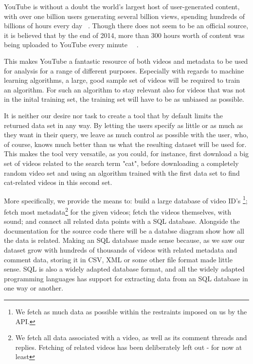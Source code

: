 
YouTube is without a doubt the world's largest host of user-generated content,
with over one billion users generating several billion views, spending hundreds
of billions of hours every day ~\cite{officialstats}. Though there does not seem
to be an official source, it is believed that by the end of 2014, more than 300
hours worth of content was being uploaded to YouTube every minute 
~\cite{dagensmediastats}~\cite{reelseostats}. 

This makes YouTube a fantastic resource of both videos and metadata to be used
for analysis for a range of different purposes. Especially with regards to
machine learning algorithms, a large, good sample set of videos will be required
to train an algorithm. For such an algorithm to stay relevant also for videos
that was not in the inital training set, the training set will have to be as
unbiased as possible.

It is neither our desire nor task to create a tool that by default limits the
returned data set in any way. By letting the users specify as little or as much
as they want in their query, we leave as much control as possible with the user,
who, of course, knows much better than us what the resulting dataset will be
used for. This makes the tool very versatile, as you could, for instance, first
download a big set of videos related to the search term "cat", before
downloading a completely random video set and using an algorithm trained with
the first data set to find cat-related videos in this second set. 

More specifically, we provide the means to: build a large database of video ID's
\footnote{We fetch as much data as possible within the restraints imposed
on us by the API.}; fetch most metadata\footnote{We fetch all data associated
with a video, as well as its comment threads and replies. Fetching of related
videos has been deliberately left out - for now at least} for the given videos;
fetch the videos themselves, with sound; and connect all related data points
with a SQL database. Alongside the documentation for the source code there will
be a databse diagram show how all the data is related. Making an SQL database
made sense because, as we saw our dataset grow with hundreds of thousands of
videos with related metadata and comment data, storing it in CSV, XML or some
other file format made little sense. SQL is also a widely adapted database
format, and all the widely adapted programming languages has support for
extracting data from an SQL database in one way or another.

